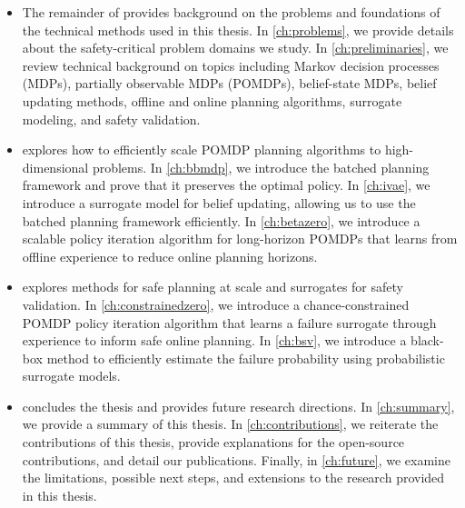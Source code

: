 \begin{itemize}
    \item The remainder of  provides background on the problems and foundations of the technical methods used in this thesis.
    In \cref{ch:problems}, we provide details about the safety-critical problem domains we study.
    In \cref{ch:preliminaries}, we review technical background on topics including Markov decision processes (MDPs), partially observable MDPs (POMDPs), belief-state MDPs, belief updating methods, offline and online planning algorithms, surrogate modeling, and safety validation.
    \item {} explores how to efficiently scale POMDP planning algorithms to high-dimensional problems.
    In \cref{ch:bbmdp}, we introduce the batched planning framework and prove that it preserves the optimal policy.
    In \cref{ch:ivae}, we introduce a surrogate model for belief updating, allowing us to use the batched planning framework efficiently.
    In \cref{ch:betazero}, we introduce a scalable policy iteration algorithm for long-horizon POMDPs that learns from offline experience to reduce online planning horizons.
    \item {} explores methods for safe planning at scale and surrogates for safety validation.
    In \cref{ch:constrainedzero}, we introduce a chance-constrained POMDP policy iteration algorithm that learns a failure surrogate through experience to inform safe online planning.
    In \cref{ch:bsv}, we introduce a black-box method to efficiently estimate the failure probability using probabilistic surrogate models.
    \item {} concludes the thesis and provides future research directions.
    In \cref{ch:summary}, we provide a summary of this thesis.
    In \cref{ch:contributions}, we reiterate the contributions of this thesis, provide explanations for the open-source contributions, and detail our publications.
    Finally, in \cref{ch:future}, we examine the limitations, possible next steps, and extensions to the research provided in this thesis.
\end{itemize}

